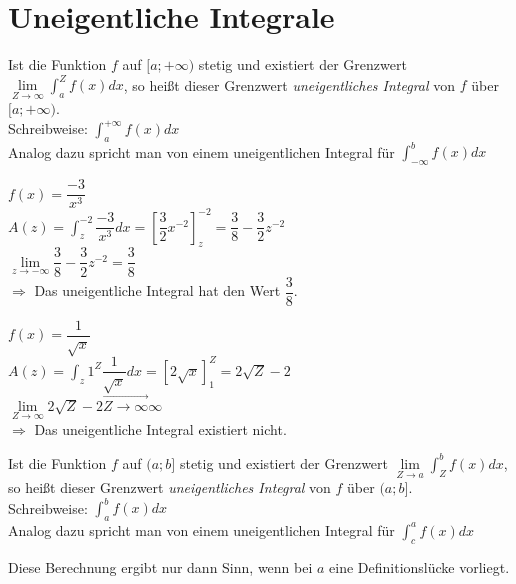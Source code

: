 \section{Uneigentliche Integrale}
\begin{Definition}
  Ist die Funktion $f$ auf $[a;+\infty)$ stetig und existiert der Grenzwert \( \displaystyle\lim\limits_{Z \rightarrow \infty} \int_a^Z f(x)dx\),
  so heißt dieser Grenzwert \emph{uneigentliches Integral} von $f$ über $[a;+\infty)$.\\
  Schreibweise: \( \displaystyle\int_a^{+\infty} f(x)dx\)\\
  Analog dazu spricht man von einem uneigentlichen Integral für \( \displaystyle\int_{-\infty}^b f(x)dx\)
\end{Definition}
\begin{Beispiel}
  $f(x)=\dfrac{-3}{x^3}$\\
  \( \displaystyle A(z)=\int_z^{-2} \dfrac{-3}{x^3} dx = \left[\dfrac{3}{2}x^{-2}\right]_z^{-2} = \dfrac{3}{8}-\dfrac{3}{2}z^{-2}\)\\
  $\lim \limits_{z \rightarrow -\infty} \dfrac{3}{8}-\dfrac{3}{2}z^{-2} = \dfrac{3}{8}$\\
  $\Rightarrow$ Das uneigentliche Integral hat den Wert $\dfrac{3}{8}$.
\end{Beispiel}
\begin{Beispiel}
  $f(x)=\dfrac{1}{\sqrt x}$\\
  \( \displaystyle A(z)=\int_z1^{Z} \dfrac{1}{\sqrt x} dx = \left[2\sqrt x \right]_1^{Z} = 2\sqrt Z - 2\)\\
  $\lim \limits_{Z \rightarrow \infty} 2\sqrt Z - 2 \stackrel{\rightarrow}{Z \rightarrow \infty} \infty$\\
  $\Rightarrow$ Das uneigentliche Integral existiert nicht.
\end{Beispiel}
\begin{Definition}
  Ist die Funktion $f$ auf $(a;b]$ stetig und existiert der Grenzwert \( \displaystyle\lim\limits_{Z \rightarrow a} \int_Z^b f(x)dx\),
  so heißt dieser Grenzwert \emph{uneigentliches Integral} von $f$ über $(a;b]$.\\
  Schreibweise: \( \displaystyle\int_a^b f(x)dx\)\\
  Analog dazu spricht man von einem uneigentlichen Integral für \( \displaystyle\int_{c}^a f(x)dx\)
\end{Definition}
\begin{Bemerkung}
  Diese Berechnung ergibt nur dann Sinn, wenn bei $a$ eine Definitionslücke vorliegt.
\end{Bemerkung}

